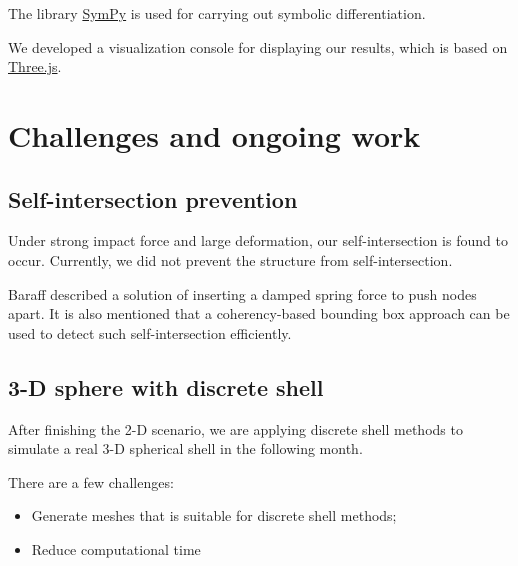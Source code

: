 \documentclass[letterpaper,9pt]{article}
\begin{document}
\begin{multicols}{2}
		The library \href{http://www.sympy.org/}{SymPy} is used for carrying out symbolic differentiation.
		
		We developed a visualization console for displaying our results, which is based on \href{https://threejs.org/}{Three.js}.	
	\section{Challenges and ongoing work}
		\subsection{Self-intersection prevention}
			Under strong impact force and large deformation, our self-intersection is found to occur. Currently, we did not prevent the structure from self-intersection.
			
			Baraff \cite{Baraff98} described a solution of inserting a damped spring force to push nodes apart. It is also mentioned that a coherency-based bounding box
			approach can be used to detect such self-intersection efficiently.
		\subsection{3-D sphere with discrete shell}
			After finishing the 2-D scenario, we are applying discrete shell methods to simulate a real 3-D spherical shell in the following month.
			
			There are a few challenges:
			\begin{itemize}
				\item Generate meshes that is suitable for discrete shell methods;
				\item Reduce computational time
			\end{itemize}
	
\end{multicols}
\end{document}
